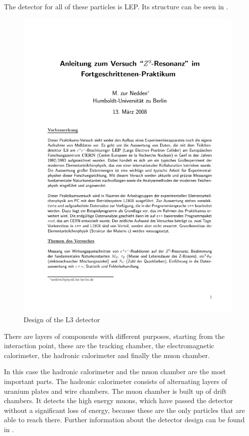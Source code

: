 \documentclass[epj,nopacs]{svjour}
\begin{document}
The detector for all of these particles is LEP. Its structure can be seen
in .
\begin{figure}[htb]
 \centering
 \includegraphics[page=5,viewport=286 620 508 765,clip,%
  width=\columnwidth,keepaspectratio]{../../Z0/docs/Z0ResFprakt}
 \caption{Design of the L3 detector \cite{script}}
 \label{fig:aufbau}
\end{figure}
There are layers of components with different purposes, starting from the
interaction point, these are the tracking chamber, the electromagnetic calorimeter,
the hadronic calorimeter and finally the muon chamber.

In this case the hadronic calorimeter and the muon chamber are the most
important parts. The hadronic calorimeter consists of alternating layers of
uranium plates and wire chambers. The muon chamber is built up of drift
chambers. It detects the high energy muons, which have passed the detector
without a significant loss of energy, because these are the only particles that
are able to reach there. Further information about the detector design can
be found in \cite{script}.
\end{document}
